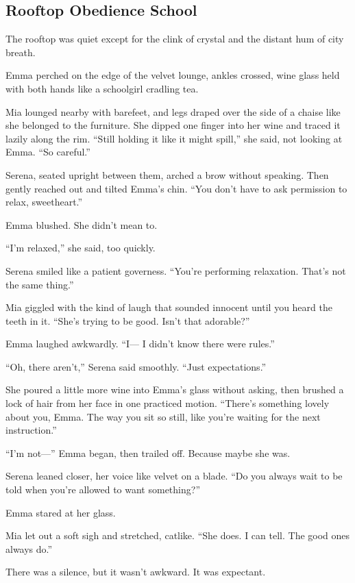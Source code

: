 
\subsection{Rooftop Obedience School}

The rooftop was quiet except for the clink of crystal and the distant hum of city breath.

Emma perched on the edge of the velvet lounge, ankles crossed, wine glass held with both 
hands like a schoolgirl cradling tea.

Mia lounged nearby with barefeet, and legs draped over the side of a chaise like she belonged to the furniture.
She dipped one finger into her wine and traced it lazily along the rim.
``Still holding it like it might spill,'' she said, not looking at Emma. ``So careful.''

Serena, seated upright between them, arched a brow without speaking. Then gently reached out and 
tilted Emma’s chin.
``You don’t have to ask permission to relax, sweetheart.''

Emma blushed. She didn’t mean to.

``I’m relaxed,'' she said, too quickly.

Serena smiled like a patient governess. ``You’re performing relaxation. That's not the same thing.''

Mia giggled with the kind of laugh that sounded innocent until you heard the teeth in it.
``She’s trying to be good. Isn’t that adorable?''

Emma laughed awkwardly. ``I— I didn’t know there were rules.''

``Oh, there aren’t,'' Serena said smoothly. ``Just expectations.''

She poured a little more wine into Emma’s glass without asking, then brushed a lock of hair from her 
face in one practiced motion.
``There’s something lovely about you, Emma. The way you sit so still, like you’re waiting for the 
next instruction.''

``I’m not—'' Emma began, then trailed off. Because maybe she was.

Serena leaned closer, her voice like velvet on a blade.
``Do you always wait to be told when you’re allowed to want something?''

Emma stared at her glass.

Mia let out a soft sigh and stretched, catlike. ``She does. I can tell. The good ones always do.''

There was a silence, but it wasn’t awkward. It was expectant.

